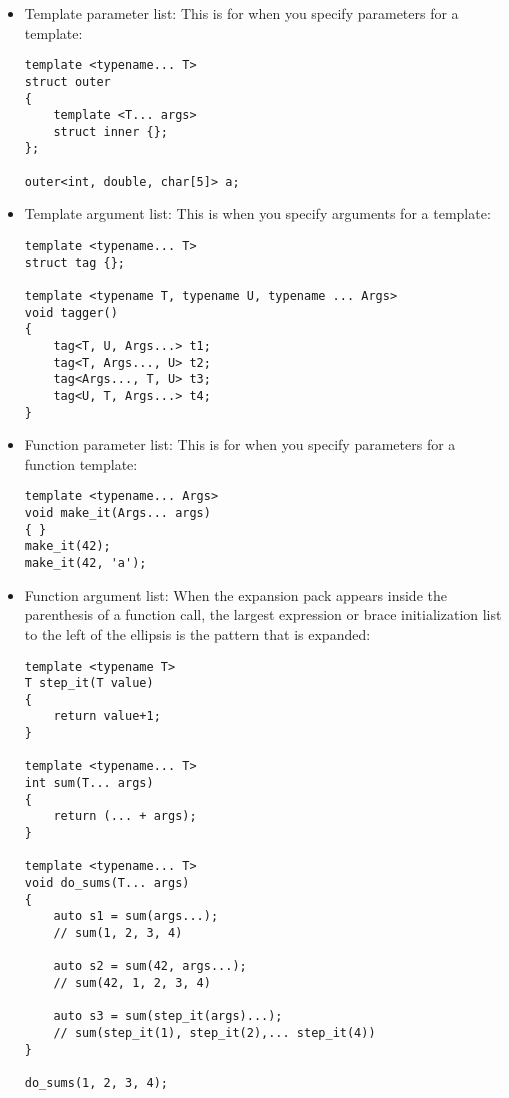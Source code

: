 \begin{itemize}
\item
Template parameter list: This is for when you specify parameters for a template:

\begin{lstlisting}[style=styleCXX]
template <typename... T>
struct outer
{
	template <T... args>
	struct inner {};
};

outer<int, double, char[5]> a;
\end{lstlisting}

\item
Template argument list: This is when you specify arguments for a template:

\begin{lstlisting}[style=styleCXX]
template <typename... T>
struct tag {};

template <typename T, typename U, typename ... Args>
void tagger()
{
	tag<T, U, Args...> t1;
	tag<T, Args..., U> t2;
	tag<Args..., T, U> t3;
	tag<U, T, Args...> t4;
}
\end{lstlisting}

\item
Function parameter list: This is for when you specify parameters for a function template:

\begin{lstlisting}[style=styleCXX]
template <typename... Args>
void make_it(Args... args)
{ }
make_it(42);
make_it(42, 'a');
\end{lstlisting}

\item
Function argument list: When the expansion pack appears inside the parenthesis of a function call, the largest expression or brace initialization list to the left of the ellipsis is the pattern that is expanded:

\begin{lstlisting}[style=styleCXX]
template <typename T>
T step_it(T value)
{
	return value+1;
}

template <typename... T>
int sum(T... args)
{
	return (... + args);
}

template <typename... T>
void do_sums(T... args)
{
	auto s1 = sum(args...);
	// sum(1, 2, 3, 4)
	
	auto s2 = sum(42, args...);
	// sum(42, 1, 2, 3, 4)
	
	auto s3 = sum(step_it(args)...);
	// sum(step_it(1), step_it(2),... step_it(4))
}

do_sums(1, 2, 3, 4);
\end{lstlisting}


\end{itemize}
